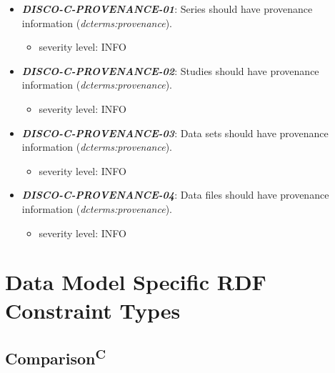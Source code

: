 \documentclass{llncs}
\begin{document}
\begin{itemize}
	\item \textbf{{\em DISCO-C-PROVENANCE-01}}: 
	Series should have provenance information (\emph{dcterms:provenance}).
	\begin{itemize}
		\item severity level: INFO
	\end{itemize}
	\item \textbf{{\em DISCO-C-PROVENANCE-02}}: 
	Studies should have provenance information (\emph{dcterms:provenance}).
	\begin{itemize}
		\item severity level: INFO
	\end{itemize}
	\item \textbf{{\em DISCO-C-PROVENANCE-03}}: 
	Data sets should have provenance information (\emph{dcterms:provenance}).
	\begin{itemize}
		\item severity level: INFO
	\end{itemize}
	\item \textbf{{\em DISCO-C-PROVENANCE-04}}: 
	Data files should have provenance information (\emph{dcterms:provenance}).
	\begin{itemize}
		\item severity level: INFO
	\end{itemize}
\end{itemize} 

\section{Data Model Specific RDF Constraint Types}
\label{data-model-specific-constraint-types}

\subsection{Comparison\textsuperscript{C}}
\end{document}
